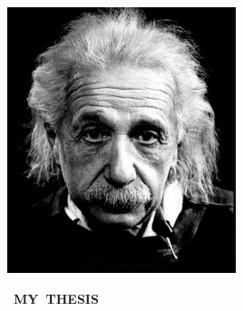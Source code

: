 \documentclass[12pt]{article}
\begin{document}
\includegraphics[width=0.5\textwidth]{eisten.png}\par
\vspace*{-3cm}
\hspace*{-1cm} \hbox{%
 \bfseries\Huge
 \color{red}%
 MY THESIS
 }
\end{document}
